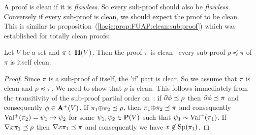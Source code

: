 A proof is clean if it is {\em flawless}. So every sub-proof should
also be {\em flawless}. Conversely if every sub-proof is clean, we
should expect the proof to be clean. This is similar to
proposition~(\ref{logic:prop:FUAP:clean:sub:proof}) which was
established for totally clean proofs:
\begin{prop}\label{logic:prop:FUAP:almostclean:sub:proof}
Let $V$ be a set and $\pi\in\mbox{${\bf\Pi}(V)$}$. Then the proof $\pi$ is clean
\ifand\ every sub-proof $\rho\preceq\pi$ of $\pi$ is itself clean.
\end{prop}
\begin{proof}
Since $\pi$ is a sub-proof of itself, the 'if' part is clear. So we
assume that $\pi$ is clean and $\rho\preceq\pi$. We need to show
that $\rho$ is clean. This follows immediately from the transitivity
of the sub-proof partial order on \pvs\,: if $\mbox{$\partial$}\phi\preceq\rho$
then $\mbox{$\partial$}\phi\preceq\pi$ and consequently $\phi\in\mbox{${\bf A}^{+}(V)$}$. If
$\pi_{1}\mbox{$\oplus$}\pi_{2}\preceq\rho$, then $\pi_{1}\mbox{$\oplus$}\pi_{2}\preceq\pi$
and consequently $\mbox{$\rm Val^{+}$}(\pi_{2})=\psi_{1}\to\psi_{2}$ for some
$\psi_{1},\psi_{2}\in\mbox{${\bf P}(V)$}$ such that $\psi_{1}\sim\mbox{$\rm Val^{+}$}(\pi_{1})$. If
$\mbox{$\nabla$} x\pi_{1}\preceq\rho$ then $\mbox{$\nabla$} x\pi_{1}\preceq\pi$ and
consequently we have $x\not\in\mbox{\rm Sp}(\pi_{1})$.
\end{proof}

